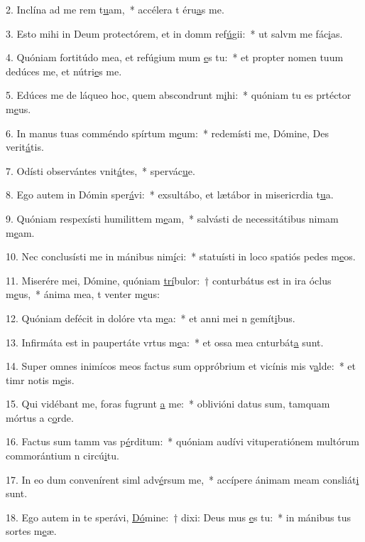 2. Inclína ad me rem t\uline{u}am,~* accélera t éru\uline{a}s me.\par 
3. Esto mihi in Deum protectórem, et in domm ref\uline{ú}gii:~* ut salvm me fác\uline{i}as.\par 
4. Quóniam fortitúdo mea, et refúgium mum \uline{e}s tu:~* et propter nomen tuum dedúces me, et nútri\uline{e}s me.\par 
5. Edúces me de láqueo hoc, quem abscondrunt m\uline{i}hi:~* quóniam tu es prtéctor m\uline{e}us.\par 
6. In manus tuas comméndo spírtum m\uline{e}um:~* redemísti me, Dómine, Des verit\uline{á}tis.\par 
7. Odísti observántes vnit\uline{á}tes,~* spervác\uline{u}e.\par 
8. Ego autem in Dómin sper\uline{á}vi:~* exsultábo, et lætábor in misericrdia t\uline{u}a.\par 
9. Quóniam respexísti humilittem m\uline{e}am,~* salvásti de necessitátibus nimam m\uline{e}am.\par 
10. Nec conclusísti me in mánibus nim\uline{í}ci:~* statuísti in loco spatiós pedes m\uline{e}os.\par 
11. Miserére mei, Dómine, quóniam \uline{trí}bulor:~† conturbátus est in ira óclus m\uline{e}us,~* ánima mea, t venter m\uline{e}us:\par 
12. Quóniam defécit in dolóre vta m\uline{e}a:~* et anni mei n gemít\uline{i}bus.\par 
13. Infirmáta est in paupertáte vrtus m\uline{e}a:~* et ossa mea cnturbát\uline{a} sunt.\par 
14. Super omnes inimícos meos factus sum oppróbrium et vicínis mis v\uline{a}lde:~* et timr notis m\uline{e}is.\par 
15. Qui vidébant me, foras fugrunt \uline{a} me:~* oblivióni datus sum, tamquam mórtus a c\uline{o}rde.\par 
16. Factus sum tamm vas p\uline{é}rditum:~* quóniam audívi vituperatiónem multórum commorántium n circú\uline{i}tu.\par 
17. In eo dum convenírent siml adv\uline{é}rsum me,~* accípere ánimam meam consliát\uline{i} sunt.\par 
18. Ego autem in te sperávi, \uline{Dó}mine:~† dixi: Deus mus \uline{e}s tu:~* in mánibus tus sortes m\uline{e}æ.\par 
